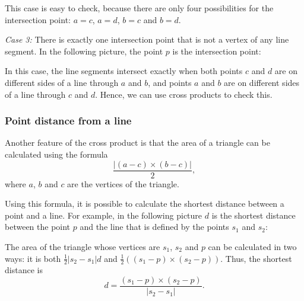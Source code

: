 This case is easy to check, because
there are only four possibilities
for the intersection point:
$a=c$, $a=d$, $b=c$ and $b=d$.

\textit{Case 3:}
There is exactly one intersection point
that is not a vertex of any line segment.
In the following picture, the point $p$
is the intersection point:
\begin{center}
\end{center}

In this case, the line segments intersect
exactly when both points $c$ and $d$ are
on different sides of a line through $a$ and $b$,
and points $a$ and $b$ are on different
sides of a line through $c$ and $d$.
Hence, we can use cross products to check this.

\subsubsection{Point distance from a line}

Another feature of the cross product is that
the area of a triangle can be calculated
using the formula
\[\frac{| (a-c) \times (b-c) |}{2},\]
where $a$, $b$ and $c$ are the vertices of the triangle.

Using this formula, it is possible to calculate the
shortest distance between a point and a line.
For example, in the following picture $d$ is the
shortest distance between the point $p$ and the line
that is defined by the points $s_1$ and $s_2$:
\begin{center}
\end{center}

The area of the triangle whose vertices are
$s_1$, $s_2$ and $p$ can be calculated in two ways:
it is both
$\frac{1}{2} |s_2-s_1| d$ and
$\frac{1}{2} ((s_1-p) \times (s_2-p))$.
Thus, the shortest distance is
\[ d = \frac{(s_1-p) \times (s_2-p)}{|s_2-s_1|} .\]

